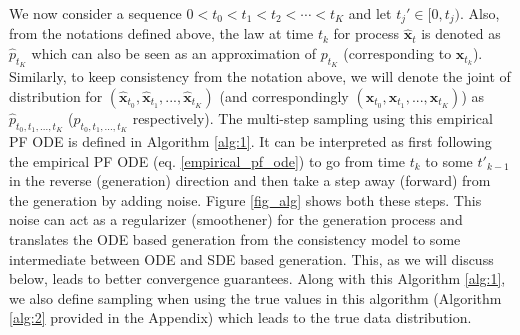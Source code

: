 \documentclass[11pt]{article}
\def\rvx{{\mathbf{x}}}
\begin{document}
\noindent
We now consider a sequence $0< t_0 < t_1 < t_2 < \cdots < t_K$ and let $t_j' \in
[0, t_j)$. Also, from the notations defined above, the law at time $t_k$ for process $\hat{\rvx}_t$ is denoted as $\hat{p}_{t_K}$ which can also be seen as an approximation of $p_{t_K}$ (corresponding to $\rvx_{t_k}$). Similarly, to keep consistency from the notation above, we will denote the joint of distribution for $(\hat{\rvx}_{t_0}, \hat{\rvx}_{t_1}, ..., \hat{\rvx}_{t_K})$ (and correspondingly $({\rvx}_{t_0}, {\rvx}_{t_1}, ..., {\rvx}_{t_K})$) as $\hat{p}_{t_0, t_1,..., t_K}$ (${p}_{t_0, t_1,..., t_K}$ respectively). 
The multi-step sampling using this empirical PF ODE is defined in Algorithm \ref{alg:1}. It can be interpreted as first following the empirical PF ODE (eq. \ref{empirical_pf_ode}) to go from time $t_k$ to some $t'_{k-1}$ in the reverse (generation) direction and then take a step away (forward) from the generation by adding noise. Figure \ref{fig_alg} shows both these steps. This noise can act as a regularizer (smoothener) for the generation process and translates the ODE based generation from the consistency model to some intermediate between ODE and SDE based generation. This, as we will discuss below, leads to better convergence guarantees.
Along with this Algorithm \ref{alg:1}, we also define sampling when using the true values in this algorithm (Algorithm \ref{alg:2} provided in the Appendix) which leads to the true data distribution. 



\vspace{0.14in}
\end{document}

